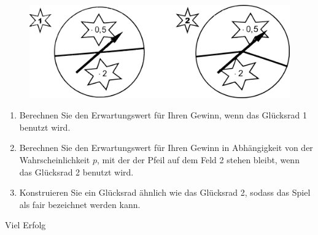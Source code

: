 \documentclass[a4paper,12pt]{article}
\begin{document}
\begin{figure}[H]
  \centering
  \includegraphics[width=0.7\columnwidth]{211203_gluecksraeder.png}
\end{figure}

\begin{enumerate}[label={\alph*)}] 
  \item Berechnen Sie den Erwartungswert für Ihren Gewinn, wenn das Glücksrad 1 benutzt wird.
  \item Berechnen Sie den Erwartungswert für Ihren Gewinn in Abhängigkeit von der Wahrscheinlichkeit $p$, mit der der Pfeil auf dem Feld 2 stehen bleibt, wenn das Glücksrad 2 benutzt wird.
  \item Konstruieren Sie ein Glücksrad ähnlich wie das Glücksrad 2, sodass das Spiel als fair bezeichnet werden kann.
\end{enumerate}

\centerline{Viel Erfolg}
\end{document}
